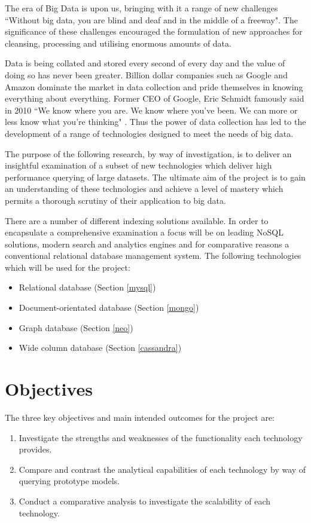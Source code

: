 The era of Big Data is upon us, bringing with it a range of new challenges ``Without big data, you are blind and deaf and in the middle of a freeway"\cite{moore}. The significance of these challenges encouraged the formulation of new approaches for cleansing, processing and utilising enormous amounts of data.

Data is being collated and stored every second of every day and the value of doing so has never been greater. Billion dollar companies such as Google and Amazon dominate the market in data collection and pride themselves in knowing everything about everything. Former CEO of Google, Eric Schmidt famously said in 2010 ``We know where you are. We know where you've been. We can more or less know what you're thinking" \cite{schmidt}. Thus the power of data collection has led to the development of a range of technologies designed to meet the needs of big data.

The purpose of the following research, by way of investigation, is to deliver an insightful examination of a subset of new technologies which deliver high performance querying of large datasets. The ultimate aim of the project is to gain an understanding of these technologies and achieve a level of mastery which permits a thorough scrutiny of their application to big data.

There are a number of different indexing solutions available. In order to encapsulate a comprehensive examination a focus will be on leading NoSQL solutions, modern search and analytics engines and for comparative reasons a conventional relational database management system. The following technologies which will be used for the project: 

\begin{itemize}
\item Relational database (Section \ref{mysql})
\item Document-orientated database (Section \ref{mongo})
\item Graph database (Section \ref{neo})
\item Wide column database (Section \ref{cassandra})
\end{itemize}

\section{Objectives}\label{objectives}
The three key objectives and main intended outcomes for the project are:
\begin{enumerate}
\item Investigate the strengths and weaknesses of the functionality each technology provides.
\item Compare and contrast the analytical capabilities of each technology by way of querying prototype models.
\item Conduct a comparative analysis to investigate the scalability of each technology.
\end{enumerate}

